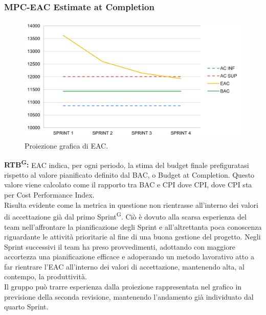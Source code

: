 \documentclass[8pt]{article}
\newcommand{\glossterm}[1]{#1\textsuperscript{G}} %
\begin{document}
\subsubsection{MPC-EAC Estimate at Completion}
\begin{figure}[h!]
    \centering
    \includegraphics[width=1\textwidth]{images_pdq/EAC.png}
    \caption{Proiezione grafica di EAC.}
    \label{fig:Proiezione grafica di EAC}
\end{figure}
\textbf{\glossterm{RTB}:} EAC indica, per ogni periodo, la stima del budget finale prefiguratasi rispetto al valore pianificato definito dal BAC, o Budget at Completion. Questo valore viene calcolato come il rapporto tra BAC e CPI dove CPI, dove CPI sta per Cost Performance Index.\\
Risulta evidente come la metrica in questione non rientrasse all'interno dei valori di accettazione già dal primo \glossterm{Sprint}. Ciò è dovuto alla scarsa esperienza del team nell'affrontare la pianificazione degli Sprint e all'altrettanta poca conoscenza riguardante le attività prioritarie al fine di una buona gestione del progetto. Negli Sprint successivi il team ha preso provvedimenti, adottando con maggiore accortezza una pianificazione efficace e adoperando un metodo lavorativo atto a far rientrare l'EAC all'interno dei valori di accettazione, mantenendo alta, al contempo, la produttività.\\
Il gruppo può trarre esperienza dalla proiezione rappresentata nel grafico in previsione della seconda revisione, mantenendo l'andamento già individuato dal quarto Sprint.
\clearpage
\end{document}

